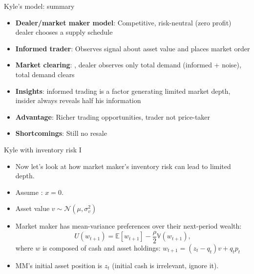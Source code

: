 \documentclass[english,10pt
,aspectratio=169
]{beamer}
\begin{document}
\begin{frame}{Kyle's model: summary}
	\begin{itemize}
		\item \textbf{Dealer/market maker model}: Competitive, risk-neutral (zero profit) dealer chooses a supply schedule
		\item \textbf{Informed trader}: Observes signal about asset value and places market order
		\item \textbf{Market clearing}: , dealer observes only total demand (informed + noise), total demand clears
		\item \textbf{Insights}: informed trading is a factor generating limited market depth, insider always reveals half his information
		\item \textbf{Advantage}: Richer trading opportunities, trader not price-taker
		\item \textbf{Shortcomings}: Still no resale
	\end{itemize}
\end{frame}


\begin{frame}{Kyle with inventory risk I}
\begin{itemize}
	\item Now let's look at how market maker's \alert{inventory risk} can lead to limited depth.
	\item Assume : $x = 0$.
	\item Asset value $v \sim \mathcal{N}(\mu, \sigma^2_v)$
	\item Market maker has mean-variance preferences over their next-period wealth:
	\[
	U(w_{t+1})=\mathbb{E}[w_{t+1}] - \frac{\rho}{2} \mathbb{V}(w_{t+1}),
	\]
	where $w$ is composed of cash and asset holdings: $w_{t+1} = (z_t - q_t) v + q_t p_t$
	\item MM's initial asset position is $z_t$ (initial cash is irrelevant, ignore it).
\end{itemize}
\end{frame}
\end{document}
